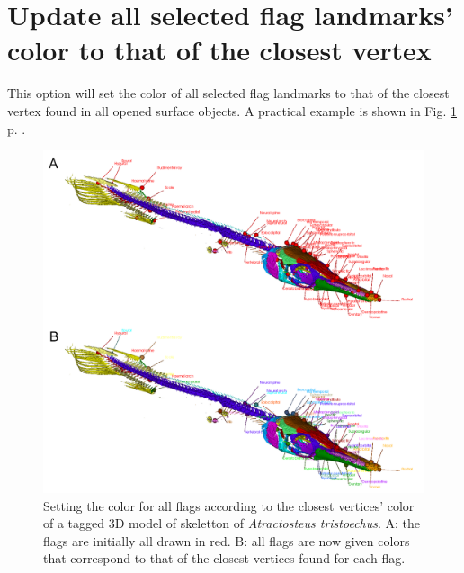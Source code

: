 \section{Update all selected flag landmarks' color to that of the closest vertex}

This option will set the color of all selected flag landmarks to that of the closest vertex found in all opened surface objects. A practical example is shown in Fig. \ref{flag_color_closest_vertex} p. \pageref{flag_color_closest_vertex}.

\begin{figure}
  \centering
  \includegraphics[scale=0.31]{images/10/edit_flag_color_closest_vertex.png} 
	\caption{Setting the color for all flags according to the closest vertices' color of a tagged 3D model of skeletton of \textit{Atractosteus tristoechus}. A: the flags are initially all  drawn in red. B: all flags are now given colors that correspond to that of the closest vertices found for each flag.}
\label{flag_color_closest_vertex}
\end{figure}
